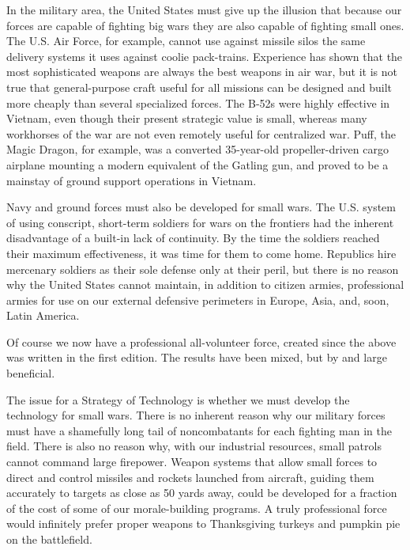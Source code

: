In the military area, the United States must give up the illusion that because our forces are capable of fighting big wars they are also capable of fighting small ones. The U.S. Air Force, for example, cannot use against missile silos the same delivery systems it uses against coolie pack-trains. Experience has shown that the most sophisticated weapons are always the best weapons in air war, but it is not true that general-purpose craft useful for all missions can be designed and built more cheaply than several specialized forces. The B-52s were highly effective in Vietnam, even though their present strategic value is small, whereas many workhorses of the war are not even remotely useful for centralized war. Puff, the Magic Dragon, for example, was a converted 35-year-old propeller-driven cargo airplane mounting a modern equivalent of the Gatling gun, and proved to be a mainstay of ground support operations in Vietnam.

Navy and ground forces must also be developed for small wars. The U.S. system of using conscript, short-term soldiers for wars on the frontiers had the inherent disadvantage of a built-in lack of continuity. By the time the soldiers reached their maximum effectiveness, it was time for them to come home. Republics hire mercenary soldiers as their sole defense only at their peril, but there is no reason why the United States cannot maintain, in addition to citizen armies, professional armies for use on our external defensive perimeters in Europe, Asia, and, soon, Latin America.

\begin{mdframed}[backgroundcolor=black!10]
Of course we now have a professional all-volunteer force, created since the above was written in the first edition. The results have been mixed, but by and large beneficial.
\end{mdframed}

The issue for a Strategy of Technology is whether we must develop the technology for small wars. There is no inherent reason why our military forces must have a shamefully long tail of noncombatants for each fighting man in the field. There is also no reason why, with our industrial resources, small patrols cannot command large firepower. Weapon systems that allow small forces to direct and control missiles and rockets launched from aircraft, guiding them accurately to targets as close as 50 yards away, could be developed for a fraction of the cost of some of our morale-building programs. A truly professional force would infinitely prefer proper weapons to Thanksgiving turkeys and pumpkin pie on the battlefield.

